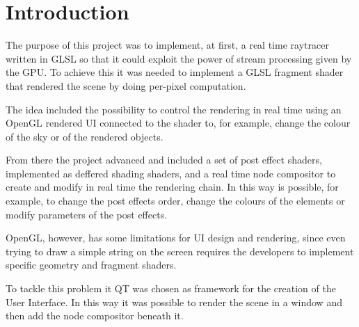 \chapter{Introduction}
	
	The purpose of this project was to implement, at first, a real time
	raytracer written in GLSL so that it could exploit the power of stream
	processing given by the GPU. To achieve this it was needed to implement
	a GLSL fragment shader that rendered the scene by doing per-pixel
	computation.
	
	The idea included the possibility to control the rendering in real time
	using an OpenGL rendered UI connected to the shader to, for example,
	change the colour of the sky or of the rendered objects.
	
	From there the project advanced and included a set of post effect shaders,
	implemented as deffered shading shaders, and a real time node compositor
	to create and modify in real time the rendering chain. In this way
	is possible, for example, to change the post effects order, change the colours of the
	elements or modify parameters of the post effects.
	
	OpenGL, however, has some limitations for UI design and rendering, since
	even trying to draw a simple string on the screen requires the developers
	to implement specific geometry and fragment shaders.
	
	To tackle this problem it QT was chosen as framework for the creation
	of the User Interface. In this way it was possible to render the scene
	in a window and then add the node compositor beneath it. 
